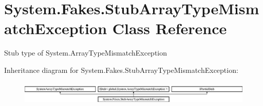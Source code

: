 \hypertarget{class_system_1_1_fakes_1_1_stub_array_type_mismatch_exception}{\section{System.\-Fakes.\-Stub\-Array\-Type\-Mismatch\-Exception Class Reference}
\label{class_system_1_1_fakes_1_1_stub_array_type_mismatch_exception}
}


Stub type of System.\-Array\-Type\-Mismatch\-Exception 


Inheritance diagram for System.\-Fakes.\-Stub\-Array\-Type\-Mismatch\-Exception\-:\begin{figure}[H]
\begin{center}
\leavevmode
\includegraphics[height=1.155831cm]{class_system_1_1_fakes_1_1_stub_array_type_mismatch_exception}
\end{center}
\end{figure}

